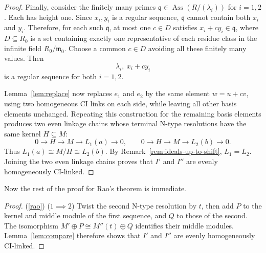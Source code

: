 \documentclass[11pt,letterpaper]{amsart}
\newcommand{\seq}{\subseteq}
\DeclareMathOperator{\Ass}{Ass}
\theoremstyle{plain}
\theoremstyle{definition}
\theoremstyle{remark}
\begin{document}
\begin{proof}
Finally, consider the finitely many primes
$\mathfrak q\in\Ass(R/(\lambda_i))$ for $i=1,2$. Each has height
one. Since $x_i,y_i$ is a regular sequence, $\mathfrak q$ cannot
contain both $x_i$ and $y_i$. Therefore, for each such
$\mathfrak q$, at most one $c\in D$ satisfies
$x_i+cy_i\in\mathfrak q$, where $D\seq R_0$ is a set containing exactly one representative of each residue class in the infinite field $R_0/\mathfrak m_0$. Choose a common $c\in D$ avoiding all
these finitely many values. Then
\[
\lambda_i,\ x_i+cy_i
\]
is a regular sequence for both $i=1,2$.

Lemma~\ref{lem:replace} now replaces $e_1$ and $e_2$ by the same
element $w=u+cv$, using two homogeneous CI links on each side,
while leaving all other basis elements unchanged. Repeating this
construction for the remaining basis elements produces two even
linkage chains whose terminal N-type resolutions have the same
kernel $H\seq M$:
\[
0\longrightarrow H\longrightarrow M\longrightarrow
L_1(a)\longrightarrow0,
\qquad
0\longrightarrow H\longrightarrow M\longrightarrow
L_2(b)\longrightarrow0.
\]
Thus $L_1(a)\cong M/H\cong L_2(b)$. By
Remark~\ref{rem:ideals-up-to-shift}, $L_1=L_2$. Joining the two
even linkage chains proves that $I'$ and $I''$ are evenly
homogeneously CI-linked.
\end{proof}

Now the rest of the proof for Rao's theorem is immediate.
\begin{proof} (\ref{rao}) ($1\implies 2$) Twist the second N-type resolution by $t$, then add $P$
to the kernel and middle module of the first sequence, and $Q$ to those of the second.
The isomorphism $M'\oplus P\cong M''(t)\oplus Q$ identifies their middle modules.
Lemma~\ref{lem:compare} therefore shows that $I'$ and $I''$ are evenly
homogeneously CI-linked.    
\end{proof}
\end{document}
